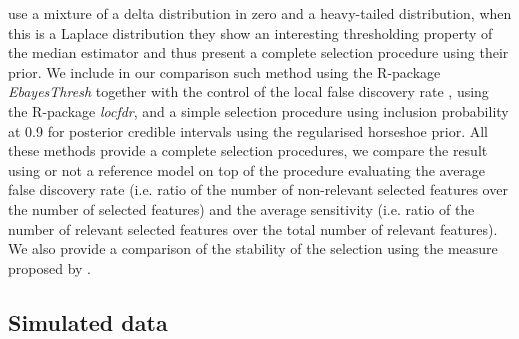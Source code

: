 \documentclass[american,]{article}
\theoremstyle{definition}
\begin{document}
\cite{paper:EBmed} use a mixture of a delta distribution in zero and a heavy-tailed distribution, when this is a Laplace distribution they show an interesting thresholding property of the median estimator and thus present a complete selection procedure using their prior. We include in our comparison such method using the R-package \textit{EbayesThresh} together with the control of the local false discovery rate \citep{book:efron, paper:efron}, using the R-package \textit{locfdr}, and a simple selection procedure using inclusion probability at 0.9 for posterior credible intervals using the regularised horseshoe prior. All these methods provide a complete selection procedures, we compare the result using or not a reference model on top of the procedure evaluating the average false discovery rate (i.e. ratio of the number of non-relevant selected features over the number of selected features) and the average sensitivity (i.e. ratio of the number of relevant selected features over the total number of relevant features). We also provide a comparison of the stability of the selection using the measure proposed by \cite{paper:stability}.

\hypertarget{simulated-data}{%
\subsection{Simulated data}\label{simulated-data}}
\end{document}
